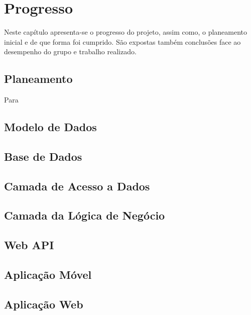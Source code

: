 %
%
\chapter{Progresso} \label{cap4}

Neste capítulo apresenta-se o progresso do projeto, assim como, o planeamento inicial e de que forma foi cumprido. São  expostas também conclusões face ao desempenho do grupo e trabalho realizado.

\section{Planeamento}\label{sec41}
Para 

\section{Modelo de Dados}\label{sec42}

\section{Base de Dados}\label{sec43}

\section{Camada de Acesso a Dados}\label{sec44}

\section{Camada da Lógica de Negócio}\label{sec45}

\section{Web API}\label{sec46}

\section{Aplicação Móvel}\label{sec47}

\section{Aplicação Web}\label{sec48}
